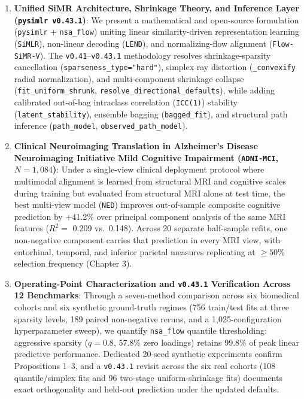 \documentclass[
  10pt,
  letterpaper,
]{report}
\providecommand{\tightlist}{%
  \setlength{\itemsep}{0pt}\setlength{\parskip}{0pt}}
\begin{document}
\begin{enumerate}
\def\labelenumi{\arabic{enumi}.}
\tightlist
\item
  \textbf{Unified SiMR Architecture, Shrinkage Theory, and Inference
  Layer (\texttt{pysimlr\ v0.43.1})}: We present a mathematical and
  open-source formulation (\texttt{pysimlr} + \texttt{nsa\_flow})
  uniting linear similarity-driven representation learning
  (\texttt{SiMLR}), non-linear decoding (\texttt{LEND}), and
  normalizing-flow alignment (\texttt{Flow-SiMR-V}). The
  \texttt{v0.41}--\texttt{v0.43.1} methodology resolves
  shrinkage-sparsity cancellation (\texttt{sparseness\_type="hard"}),
  simplex ray distortion (\texttt{\_convexify} radial normalization),
  and multi-component shrinkage collapse (\texttt{fit\_uniform\_shrunk},
  \texttt{resolve\_directional\_defaults}), while adding calibrated
  out-of-bag intraclass correlation (\texttt{ICC(1)}) stability
  (\texttt{latent\_stability}), ensemble bagging (\texttt{bagged\_fit}),
  and structural path inference (\texttt{path\_model},
  \texttt{observed\_path\_model}).
\item
  \textbf{Clinical Neuroimaging Translation in Alzheimer's Disease
  Neuroimaging Initiative Mild Cognitive Impairment (\texttt{ADNI-MCI},
  \(N = 1,084\))}: Under a single-view clinical deployment protocol
  where multimodal alignment is learned from structural MRI and
  cognitive scales during training but evaluated from structural MRI
  alone at test time, the best multi-view model (\texttt{NED}) improves
  out-of-sample composite cognitive prediction by +41.2\% over principal
  component analysis of the same MRI features (\(R^2 =\) 0.209
  vs.~0.148). Across 20 separate half-sample refits, one non-negative
  component carries that prediction in every MRI view, with entorhinal,
  temporal, and inferior parietal measures replicating at \(\ge 50\%\)
  selection frequency (Chapter 3).
\item
  \textbf{Operating-Point Characterization and \texttt{v0.43.1}
  Verification Across 12 Benchmarks}: Through a seven-method comparison
  across six biomedical cohorts and six synthetic ground-truth regimes
  (756 train/test fits at three sparsity levels, 189 paired non-negative
  reruns, and a 1,025-configuration hyperparameter sweep), we quantify
  \texttt{nsa\_flow} quantile thresholding: aggressive sparsity
  (\(q = 0.8\), 57.8\% zero loadings) retains 99.8\% of peak linear
  predictive performance. Dedicated 20-seed synthetic experiments
  confirm Propositions 1--3, and a \texttt{v0.43.1} revisit across the
  six real cohorts (108 quantile/simplex fits and 96 two-stage
  uniform-shrinkage fits) documents exact orthogonality and held-out
  prediction under the updated defaults.
\end{enumerate}
\end{document}
